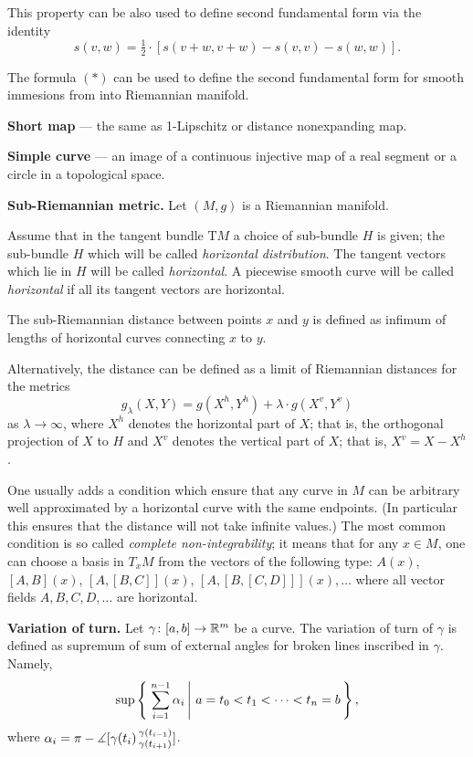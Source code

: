 \begin{description}
This property can be also used to define second fundamental form via the identity
$$s(v,w)=\tfrac 12\cdot[s(v+w,v+w)-s(v,v)-s(w,w)].$$

The formula $({*})$ can be used to define the second fundamental form for smooth immesions from into Riemannian manifold.

\item{\bf Short map}\label{Short map} --- the same as 1-Lipschitz 
or distance nonexpanding map.

\item{\bf Simple curve}\label{Simple curve} --- an image of a continuous injective map of a real segment or a circle in a topological space.

\item{\bf Sub-Riemannian metric.}\label{Sub-Riemannian metric}
Let $(M,g)$ is a Riemannian manifold.

Assume that in the tangent bundle $\mathrm{T} M$ 
a choice of sub-bundle $H$ is given;
the sub-bundle $H$ which will be called  \emph{horizontal distribution}.
The tangent vectors which lie in $H$ will be called \emph{horizontal}.
A piecewise smooth curve will be called \emph{horizontal}
if all its tangent vectors are horizontal.

The sub-Riemannian distance between points $x$ and $y$ is defined as infimum of lengths of horizontal curves connecting $x$ to $y$.

Alternatively, the distance can be defined as a limit of Riemannian distances 
for the metrics 
\[g_\lambda(X,Y)=g(X^h,Y^h)+\lambda\cdot g(X^v,Y^v)\] 
as $\lambda\to \infty$,
where $X^h$ denotes the horizontal part of $X$;
that is, the orthogonal projection of $X$ to $H$
and $X^v$ denotes the vertical part of $X$;
that is, $X^v=X-X^h$.

One usually adds a condition which ensure that any curve in $M$ can be arbitrary well approximated by a horizontal curve with the same endpoints.
(In particular this ensures that the distance will not take infinite values.)
The most common condition is so called  \emph{complete non-integrability};
it means that for any $x\in M$, 
one can choose a basis in $T_xM$
from the vectors of the following type:
$A(x)$, $[A,B](x)$, $[A,[B,C]](x)$, $[A,[B,[C,D]]](x),\dots$ where all vector fields $A,B,C,D, \dots$ are horizontal.


\item{\bf Variation of turn.}
\label{Variation of turn} 
Let $\gamma\colon[a,b]\to\mathbb{R}^m$ be a curve.
The variation of turn of $\gamma$ is defined as supremum of sum of external angles for broken lines inscribed in $\gamma$. 
Namely, 
$$\sup\set{\sum_{i=1}^{n-1}\alpha_i}{a=t_0<t_1<\dots<t_n=b},$$
where $\alpha_i=\pi-\measuredangle [\gamma(t_{i})\,{}^{\gamma(t_{i-1})}_{\gamma(t_{i+1})}]$.
\end{description}